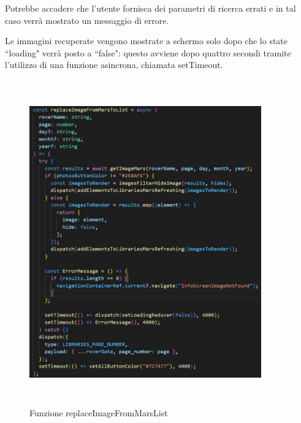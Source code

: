 Potrebbe accadere che l'utente fornisca dei parametri di ricerca errati e in tal caso verr\`a mostrato un messaggio di errore.

Le immagini recuperate vengono mostrate a schermo solo dopo che lo state ``loading" verr\`a posto a ``false": questo avviene dopo quattro secondi tramite l'utilizzo di una funzione asincrona, chiamata setTimeout.
\begin{figure}[h]
    \centering
    \includegraphics[width=10cm, height=14cm]{images/ReplaceImageFunction.jpg}
    \caption[differenzeiteot]{Funzione replaceImageFromMarsList}
    \label{fig:replaceImageFunction}
\end{figure}

